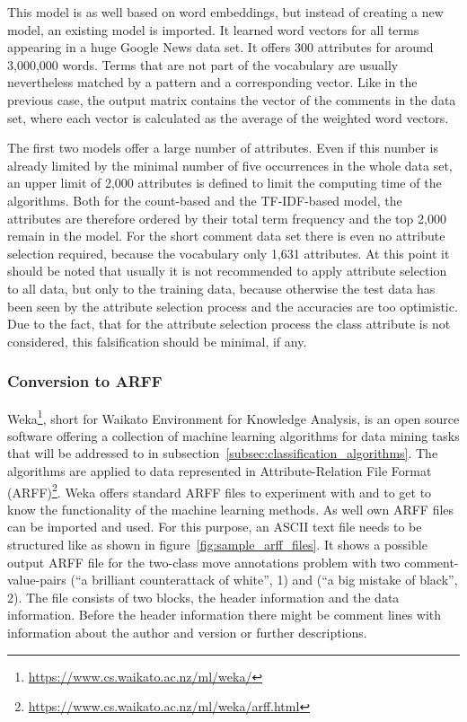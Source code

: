 \documentclass[article,type=msc,colorback,accentcolor=tud7b]{tudthesis}
\begin{document}
\begin{itemize}
        This model is as well based on word embeddings, but instead of creating a new model, an existing model is imported. It learned word vectors for all terms appearing in a huge Google News data set. It offers 300 attributes for around 3,000,000 words. Terms that are not part of the vocabulary are usually nevertheless matched by a pattern and a corresponding vector. Like in the previous case, the output matrix contains the vector of the comments in the data set, where each vector is calculated as the average of the weighted word vectors.
    \end{itemize}
    The first two models offer a large number of attributes. Even if this number is already limited by the minimal number of five occurrences in the whole data set, an upper limit of 2,000 attributes is defined to limit the computing time of the algorithms. Both for the count-based and the TF-IDF-based model, the attributes are therefore ordered by their total term frequency and the top 2,000 remain in the model. For the short comment data set there is even no attribute selection required, because the vocabulary only 1,631 attributes. At this point it should be noted that usually it is not recommended to apply attribute selection to all data, but only to the training data, because otherwise the test data has been seen by the attribute selection process and the accuracies are too optimistic. Due to the fact, that for the attribute selection process the class attribute is not considered, this falsification should be minimal, if any.
  
  \subsubsection{Conversion to ARFF}
    Weka\footnote{\url{https://www.cs.waikato.ac.nz/ml/weka/}}, short for Waikato Environment for Knowledge Analysis, is an open source software offering a collection of machine learning algorithms for data mining tasks that will be addressed to in subsection~\ref{subsec:classification_algorithms}. The algorithms are applied to data represented in Attribute-Relation File Format (ARFF)\footnote{\url{https://www.cs.waikato.ac.nz/ml/weka/arff.html}}. Weka offers standard ARFF files to experiment with and to get to know the functionality of the machine learning methods. As well own ARFF files can be imported and used. For this purpose, an ASCII text file needs to be structured like as shown in figure~\ref{fig:sample_arff_files}. It shows a possible output ARFF file for the two-class move annotations problem with two comment-value-pairs (“a brilliant counterattack of white”, 1) and (“a big mistake of black”, 2). The file consists of two blocks, the header information and the data information. Before the header information there might be comment lines with information about the author and version or further descriptions.
    
\end{document}
